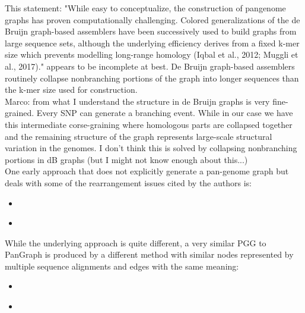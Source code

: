 \documentclass[aps,rmp,onecolumn]{revtex4-1}
\newcommand{\Marco}[1]{{\color{gray}Marco: #1}}
\begin{document}
This statement: "While easy to conceptualize, the construction of pangenome graphs has proven computationally challenging. Colored generalizations of the de Bruijn graph-based assemblers have been successively used to build graphs from large sequence sets, although the underlying efficiency derives from a fixed k-mer size which prevents modelling long-range homology (Iqbal et al., 2012; Muggli et al., 2017)." appears to be incomplete at best. De Bruijn graph-based assemblers routinely collapse nonbranching portions of the graph into longer sequences than the k-mer size used for construction.\\
\Marco{from what I understand the structure in de Bruijn graphs is very fine-grained. Every SNP can generate a branching event. While in our case we have this intermediate corse-graining where homologous parts are collapsed together and the remaining structure of the graph represents large-scale structural variation in the genomes. I don't think this is solved by collapsing nonbranching portions in dB graphs (but I might not know enough about this...)}\\
One early approach that does not explicitly generate a pan-genome graph but deals with some of the rearrangement issues cited by the authors is:
\begin{itemize}
      \item \cite{angiuoli2011improving}
      \item \cite{angiuoli2011mugsy}
\end{itemize}
While the underlying approach is quite different, a very similar PGG to PanGraph is produced by a different method with similar nodes represented by multiple sequence alignments and edges with the same meaning:
\begin{itemize}
      \item \cite{sutton2021pan}
      \item \cite{chan2015novel}
\end{itemize}
\end{document}

